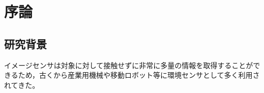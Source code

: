 \documentclass[fleqn]{jreport}
\begin{document}
\chapter{序論}\label{Introduction}
	
\section{研究背景}
イメージセンサは対象に対して接触せずに非常に多量の情報を取得することができるため，古くから産業用機械や移動ロボット等に環境センサとして多く利用されてきた\cite{Hashimoto2009}\cite{Corke2011}。
\end{document}
